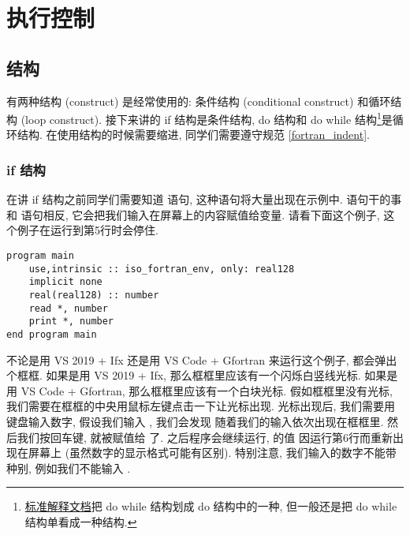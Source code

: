 \chapter{执行控制}

\section{结构}

有两种结构 (construct) 是经常使用的: 条件结构 (conditional construct) 和循环结构 (loop construct). 接下来讲的 if 结构是条件结构, do 结构和 do while 结构\footnote{\href{https://j3-fortran.org/doc/year/24/24-007.pdf}{标准解释文档}把 do while 结构划成 do 结构中的一种, 但一般还是把 do while 结构单看成一种结构.}是循环结构. 在使用结构的时候需要缩进, 同学们需要遵守规范 \ref{fortran_indent}.

\subsection{if 结构}\label{if_construct}

在讲 if 结构之前同学们需要知道  语句, 这种语句将大量出现在示例中.  语句干的事和  语句相反, 它会把我们输入在屏幕上的内容赋值给变量. 请看下面这个例子, 这个例子在运行到第5行时会停住.
\begin{lstlisting}
program main
    use,intrinsic :: iso_fortran_env, only: real128
    implicit none
    real(real128) :: number
    read *, number
    print *, number
end program main
\end{lstlisting}
不论是用 VS 2019 + Ifx 还是用 VS Code + Gfortran 来运行这个例子, 都会弹出个框框. 如果是用 VS 2019 + Ifx, 那么框框里应该有一个闪烁白竖线光标. 如果是用 VS Code + Gfortran, 那么框框里应该有一个白块光标. 假如框框里没有光标, 我们需要在框框的中央用鼠标左键点击一下让光标出现. 光标出现后, 我们需要用键盘输入数字, 假设我们输入 , 我们会发现  随着我们的输入依次出现在框框里. 然后我们按回车键,  就被赋值给  了. 之后程序会继续运行,  的值  因运行第6行而重新出现在屏幕上 (虽然数字的显示格式可能有区别). 特别注意, 我们输入的数字不能带种别, 例如我们不能输入 .


